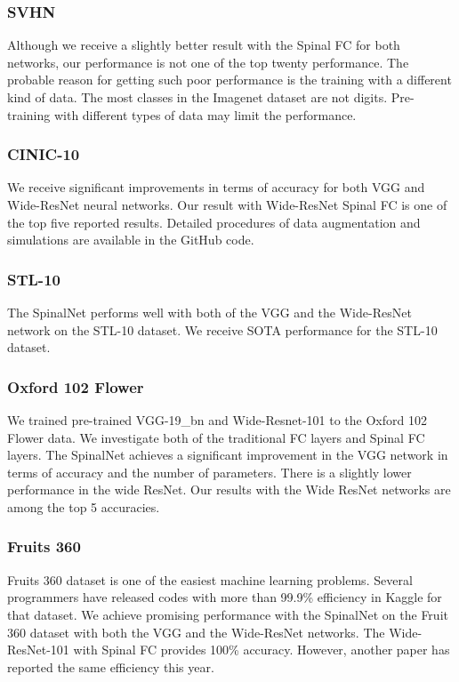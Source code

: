 \documentclass[journal]{IEEEtran}
\begin{document}
\subsubsection{SVHN}
Although we receive a slightly better result with the Spinal FC for both networks, our performance is not one of the top twenty performance. The probable reason for getting such poor performance is the training with a different kind of data. The most classes in the Imagenet dataset are not digits. Pre-training with different types of data may limit the performance. 

\subsubsection{CINIC-10}
We receive significant improvements in terms of accuracy for both VGG and Wide-ResNet neural networks. Our result with Wide-ResNet Spinal FC is one of the top five reported results. Detailed procedures of data augmentation and simulations are available in the GitHub code.

\subsubsection{STL-10}
The SpinalNet performs well with both of the VGG and the Wide-ResNet network on the STL-10 dataset. We receive SOTA performance for the STL-10 dataset.

\subsubsection{Oxford 102 Flower}
We trained pre-trained VGG-19\_bn and Wide-Resnet-101 to the Oxford 102 Flower data. We investigate both of the traditional FC layers and Spinal FC layers. The SpinalNet achieves a significant improvement in the VGG network in terms of accuracy and the number of parameters. There is a slightly lower performance in the wide ResNet. Our results with the Wide ResNet networks are among the top 5 accuracies.

\subsubsection{Fruits 360}
Fruits 360 dataset is one of the easiest machine learning problems. Several programmers have released codes with more than 99.9\% efficiency in Kaggle for that dataset. We achieve promising performance with the SpinalNet on the Fruit 360 dataset with both the VGG and the Wide-ResNet networks. The Wide-ResNet-101 with Spinal FC provides 100\% accuracy. However, another paper has reported the same efficiency this year.
\end{document}
